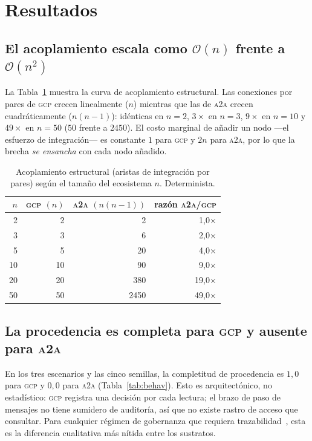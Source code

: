 \documentclass[10pt,twocolumn,letterpaper]{article}
\newcommand{\gcp}{\textsc{gcp}}
\newcommand{\ata}{\textsc{a2a}}
\newcommand{\bigoh}{\mathcal{O}}
\begin{document}
\section{Resultados}
\label{sec:results}

\subsection{El acoplamiento escala como $\bigoh(n)$ frente a $\bigoh(n^2)$}
La Tabla~\ref{tab:struct} muestra la curva de acoplamiento estructural. Las
conexiones por pares de \gcp{} crecen linealmente ($n$) mientras que las de \ata{}
crecen cuadráticamente ($n(n{-}1)$): idénticas en $n{=}2$, $3\times$ en $n{=}3$,
$9\times$ en $n{=}10$ y $49\times$ en $n{=}50$ ($50$ frente a $2450$). El costo
marginal de añadir un nodo ---el esfuerzo de integración--- es constante $1$ para
\gcp{} y $2n$ para \ata{}, por lo que la brecha \emph{se ensancha} con cada nodo
añadido.

\begin{table}[t]
\centering
\caption{Acoplamiento estructural (aristas de integración por pares) según el
tamaño del ecosistema $n$. Determinista.}
\label{tab:struct}
\begin{tabular}{rrrr}
\toprule
$n$ & \gcp{} $(n)$ & \ata{} $(n(n{-}1))$ & razón \ata{}/\gcp{} \\
\midrule
2  & 2  & 2    & 1{,}0$\times$ \\
3  & 3  & 6    & 2{,}0$\times$ \\
5  & 5  & 20   & 4{,}0$\times$ \\
10 & 10 & 90   & 9{,}0$\times$ \\
20 & 20 & 380  & 19{,}0$\times$ \\
50 & 50 & 2450 & 49{,}0$\times$ \\
\bottomrule
\end{tabular}
\end{table}

\subsection{La procedencia es completa para \gcp{} y ausente para \ata{}}
En los tres escenarios y las cinco semillas, la completitud de procedencia es
$1{,}0$ para \gcp{} y $0{,}0$ para \ata{} (Tabla~\ref{tab:behav}). Esto es
arquitectónico, no estadístico: \gcp{} registra una decisión por cada lectura; el
brazo de paso de mensajes no tiene sumidero de auditoría, así que no existe rastro
de acceso que consultar. Para cualquier régimen de gobernanza que requiera
trazabilidad~\citep{ojewale2025audit,owasp2025}, esta es la diferencia cualitativa
más nítida entre los sustratos.
\end{document}
